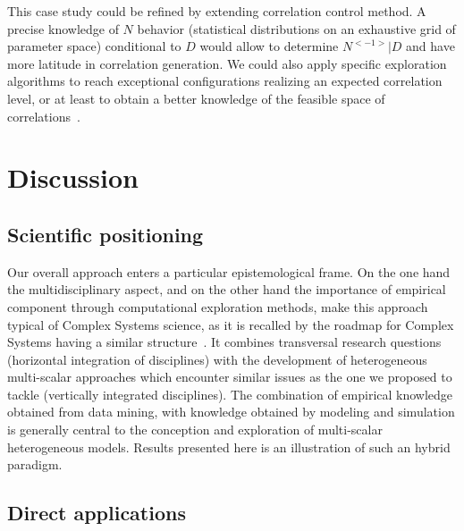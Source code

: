 \documentclass{article}
\begin{document}
This case study could be refined by extending correlation control method. A precise knowledge of $N$ behavior (statistical distributions on an exhaustive grid of parameter space) conditional to $D$ would allow to determine $N^{<-1>} | D$ and have more latitude in correlation generation. We could also apply specific exploration algorithms to reach exceptional configurations realizing an expected correlation level, or at least to obtain a better knowledge of the feasible space of correlations~\cite{10.1371/journal.pone.0138212}.





\section*{Discussion}


\subsection*{Scientific positioning}


Our overall approach enters a particular epistemological frame. On the one hand the multidisciplinary aspect, and on the other hand the importance of empirical component through computational exploration methods, make this approach typical of Complex Systems science, as it is recalled by the roadmap for Complex Systems having a similar structure~\cite{2009arXiv0907.2221B}. It combines transversal research questions (horizontal integration of disciplines) with the development of heterogeneous multi-scalar approaches which encounter similar issues as the one we proposed to tackle (vertically integrated disciplines). The combination of empirical knowledge obtained from data mining, with knowledge obtained by modeling and simulation is generally central to the conception and exploration of multi-scalar heterogeneous models. Results presented here is an illustration of such an hybrid paradigm.



\subsection*{Direct applications}
\end{document}

